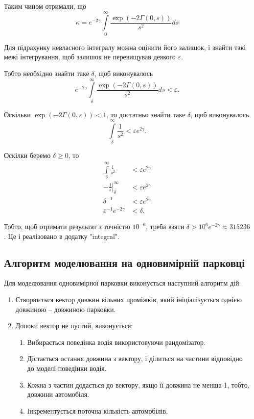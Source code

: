 Таким чином отримали, що
\begin{equation}
\kappa = e^{-2\gamma} \int\limits_0^\infty \frac{\exp(-2\Gamma(0,s))}{s^2} ds
\end{equation}

Для підрахунку невласного інтегралу можна оцінити його залишок, і знайти такі межі інтегрування, щоб залишок не перевищував деякого $\varepsilon$.

Тобто необхідно знайти таке $\delta$, щоб виконувалось
$$
	e^{-2\gamma} \int\limits_\delta^\infty \frac{\exp(-2\Gamma(0,s))}{s^2} ds < \varepsilon.
$$

Оскільки $\exp(-2\Gamma(0,s)) < 1$, то достатньо знайти таке $\delta$, щоб виконувалось
$$
	\int\limits_\delta^\infty \frac{1}{s^2} < \varepsilon e^{2\gamma}.
$$

Оскілки беремо $\delta \geq 0$, то
\begin{align*}
	\int\limits_\delta^\infty \frac{1}{s^2} &< \varepsilon e^{2\gamma}\\
	-\left. \frac{1}{s} \right|_\delta^\infty &< \varepsilon e^{2\gamma} \\
	\delta^{-1} &< \varepsilon e^{2\gamma}  \\
	\varepsilon^{-1} e^{-2\gamma} &< \delta.
\end{align*}

Тобто, щоб отримати результат з точністю $10^{-6}$, треба взяти  $\delta > 10^6 e^{-2\gamma} \approx 315236$. Це і реалізовано в додатку "integral".

\subsection{Алгоритм моделювання на одновимірній парковці}

Для моделювання одновимірної парковки виконується наступний алгоритм дій:
\begin{enumerate}[label={\arabic*.}]
\item Створюється вектор довжин вільних проміжків, який ініціалізується однією довжиною – довжиною парковки. 
\item Допоки вектор не пустий, виконується: 
\begin{enumerate}[label={2.\arabic*.}]
\item Вибирається поведінка водія використовуючи рандомізатор.
\item Дістається остання довжина з вектору, і ділиться на частини відповідно до моделі поведінки водія.
\item Кожна з частин додається до вектору, якщо її довжина не менша 1, тобто, довжини автомобіля.
\item Інкрементується поточна кількість автомобілів.
\end{enumerate}
\end{enumerate}

